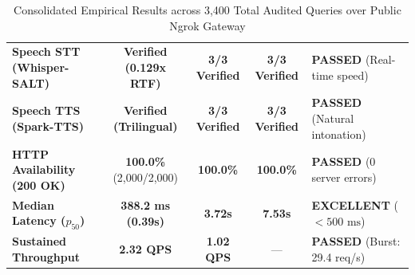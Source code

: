 \documentclass[10pt,a4paper]{article}
\begin{document}
\begin{table}[h!]
\begin{tabularx}{\textwidth}{p{44mm} c c c X}
\textbf{Speech STT (Whisper-SALT)} & \textbf{Verified (0.129x RTF)} & \textbf{3/3 Verified} & \textbf{3/3 Verified} & \textbf{PASSED} (Real-time speed) \\
\textbf{Speech TTS (Spark-TTS)} & \textbf{Verified (Trilingual)} & \textbf{3/3 Verified} & \textbf{3/3 Verified} & \textbf{PASSED} (Natural intonation) \\
\textbf{HTTP Availability (200 OK)} & \textbf{100.0\%} (2,000/2,000) & \textbf{100.0\%} & \textbf{100.0\%} & \textbf{PASSED} (0 server errors) \\
\textbf{Median Latency ($p_{50}$)} & \textbf{388.2 ms (0.39s)} & \textbf{3.72s} & \textbf{7.53s} & \textbf{EXCELLENT} ($<500\text{ ms}$) \\
\textbf{Sustained Throughput} & \textbf{2.32 QPS} & \textbf{1.02 QPS} & --- & \textbf{PASSED} (Burst: 29.4 req/s) \\
\bottomrule
\end{tabularx}
\caption{Consolidated Empirical Results across 3,400 Total Audited Queries over Public Ngrok Gateway}
\end{table}
\end{document}
